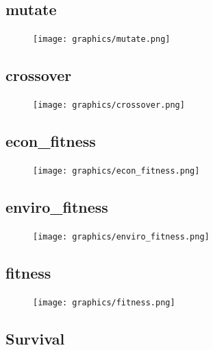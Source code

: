 \documentclass{article}
\begin{document}
    \subsection{mutate}
    \begin{figure}[h!]
        \begin{center}
            \texttt{[image: graphics/mutate.png]}
        \end{center}                
    \end{figure}   
    \subsection{crossover}
    \begin{figure}[h!]
        \begin{center}
            \texttt{[image: graphics/crossover.png]}
        \end{center}                
    \end{figure}   
    \newpage
    \subsection{econ\_fitness}
    \begin{figure}[h!]
        \begin{center}
            \texttt{[image: graphics/econ\_fitness.png]}
        \end{center}                
    \end{figure}   
    \subsection{enviro\_fitness}
    \begin{figure}[h!]
        \begin{center}
            \texttt{[image: graphics/enviro\_fitness.png]}
        \end{center}                
    \end{figure}   
    \newpage
    \subsection{fitness}
    \begin{figure}[h!]
        \begin{center}
            \texttt{[image: graphics/fitness.png]}
        \end{center}                
    \end{figure}   
    \subsection{Survival}
\end{document}
